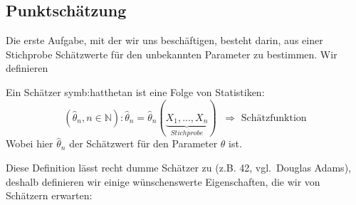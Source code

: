 \subsection{Punktschätzung}
Die erste Aufgabe, mit der wir uns beschäftigen, besteht darin, aus einer
Stichprobe Schätzwerte für den unbekannten Parameter zu bestimmen.
Wir definieren
\begin{definition}
Ein Schätzer \gls{symb:hatthetan} ist eine Folge von Statistiken:
\[(\hat\theta_n, n\in \mathbb{N}): \hat\theta_n=\hat\theta_n(\underbrace{X_1, ..., X_n}_{Stichprobe})\;\;\Rightarrow\text{ Schätzfunktion}\]
Wobei hier $\hat\theta_n$ der Schätzwert für den Parameter $\theta$ ist.
\end{definition}
Diese Definition lässt recht dumme Schätzer zu (z.B. 42, vgl.\ Douglas
Adams), deshalb definieren wir einige wünschenswerte Eigenschaften, die wir von Schätzern erwarten:
